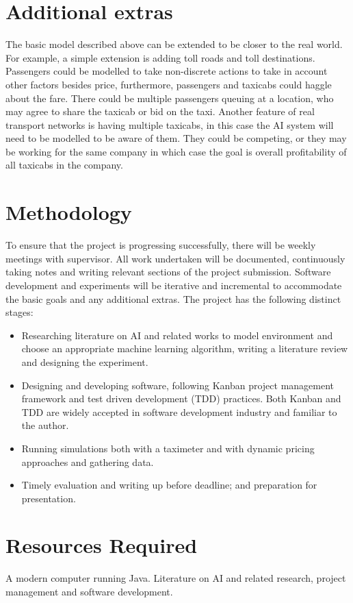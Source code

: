 \documentclass[a4paper,12pt]{article}
\begin{document}
\section*{Additional extras} The basic model described above can be extended to be closer to the real world. For example, a simple extension is adding toll roads and toll destinations. Passengers could be modelled to take non-discrete actions to take in account other factors besides price, furthermore, passengers and taxicabs could haggle about the fare. There could be multiple passengers queuing at a location, who may agree to share the taxicab or bid on the taxi. Another feature of real transport networks is having multiple taxicabs, in this case the AI system will need to be modelled to be aware of them. They could be competing, or they may be working for the same company in which case the goal is overall profitability of all taxicabs in the company.

\section*{Methodology}
To ensure that the project is progressing successfully, there will be weekly meetings with supervisor. All work undertaken will be documented, continuously taking notes and writing relevant sections of the project submission. Software development and experiments will be iterative and incremental to accommodate the basic goals and any additional extras. The project has the following distinct stages:
\begin{itemize} 
\item Researching literature on AI and related works to model environment and choose an appropriate machine learning algorithm, writing a literature review and designing the experiment.
\item Designing and developing software, following Kanban project management framework and test driven development (TDD) practices. Both Kanban and TDD are widely accepted in software development industry and familiar to the author.
\item Running simulations both with a taximeter and with dynamic pricing approaches and gathering data.
\item Timely evaluation and writing up before deadline; and preparation for presentation.
\end{itemize}

\section*{Resources Required}
A modern computer running Java. Literature on AI and related research, project management and software development.
\end{document}

